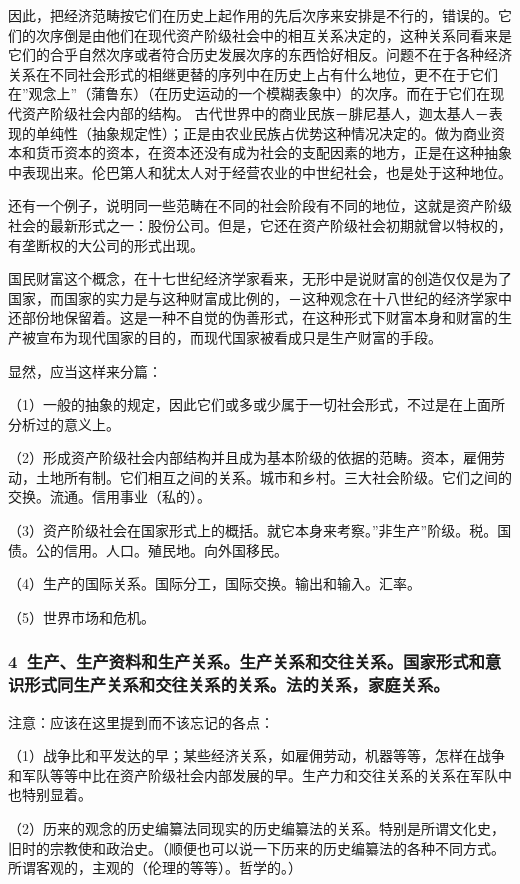 \documentclass[a4paper,twoside,12pt]{ctexart}
\begin{document}
因此，把经济范畴按它们在历史上起作用的先后次序来安排是不行的，错误的。它们的次序倒是由他们在现代资产阶级社会中的相互关系决定的，这种关系同看来是它们的合乎自然次序或者符合历史发展次序的东西恰好相反。问题不在于各种经济关系在不同社会形式的相继更替的序列中在历史上占有什么地位，更不在于它们在”观念上”（蒲鲁东）（在历史运动的一个模糊表象中）的次序。而在于它们在现代资产阶级社会内部的结构。
古代世界中的商业民族－腓尼基人，迦太基人－表现的单纯性（抽象规定性）；正是由农业民族占优势这种情况决定的。做为商业资本和货币资本的资本，在资本还没有成为社会的支配因素的地方，正是在这种抽象中表现出来。伦巴第人和犹太人对于经营农业的中世纪社会，也是处于这种地位。

还有一个例子，说明同一些范畴在不同的社会阶段有不同的地位，这就是资产阶级社会的最新形式之一：股份公司。但是，它还在资产阶级社会初期就曾以特权的，有垄断权的大公司的形式出现。

国民财富这个概念，在十七世纪经济学家看来，无形中是说财富的创造仅仅是为了国家，而国家的实力是与这种财富成比例的，－这种观念在十八世纪的经济学家中还部份地保留着。这是一种不自觉的伪善形式，在这种形式下财富本身和财富的生产被宣布为现代国家的目的，而现代国家被看成只是生产财富的手段。

显然，应当这样来分篇：

（1）一般的抽象的规定，因此它们或多或少属于一切社会形式，不过是在上面所分析过的意义上。

（2）形成资产阶级社会内部结构并且成为基本阶级的依据的范畴。资本，雇佣劳动，土地所有制。它们相互之间的关系。城市和乡村。三大社会阶级。它们之间的交换。流通。信用事业（私的）。

（3）资产阶级社会在国家形式上的概括。就它本身来考察。”非生产”阶级。税。国债。公的信用。人口。殖民地。向外国移民。

（4）生产的国际关系。国际分工，国际交换。输出和输入。汇率。

（5）世界市场和危机。

\subsubsection{4~生产、生产资料和生产关系。生产关系和交往关系。国家形式和意识形式同生产关系和交往关系的关系。法的关系，家庭关系。}

注意：应该在这里提到而不该忘记的各点：

（1）战争比和平发达的早；某些经济关系，如雇佣劳动，机器等等，怎样在战争和军队等等中比在资产阶级社会内部发展的早。生产力和交往关系的关系在军队中也特别显着。

（2）历来的观念的历史编纂法同现实的历史编纂法的关系。特别是所谓文化史，旧时的宗教使和政治史。（顺便也可以说一下历来的历史编纂法的各种不同方式。所谓客观的，主观的（伦理的等等）。哲学的。）
\end{document}
